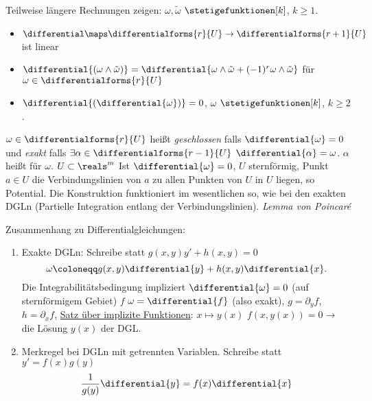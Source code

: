 \begin{blank}
  \begin{bemerkung*}
    Teilweise längere Rechnungen zeigen: \( \omega,\tilde{\omega}\) \( \stetigefunktionen[k]\), \( k\geq 1. \)

    \begin{itemize}
      \item \( \differential\maps \differentialforms{r}{U}\to\differentialforms{r+1}{U} \) ist linear 

      \item \( \differential{(\omega\wedge\tilde{\omega})}=\differential{\omega\wedge\tilde{\omega}+(-1)^r\omega\wedge\tilde{\omega}} \) für \( \omega\in\differentialforms{r}{U} \)
  
      \item \( \differential{(\differential{\omega})}=0 \), \( \omega\) \( \stetigefunktionen[k]\), \( k\geq 2 \).
    \end{itemize}
  \end{bemerkung*}
  \begin{definition*}
    \( \omega\in\differentialforms{r}{U} \) heißt \emph{geschlossen} falls \( \differential{\omega}=0 \) und \emph{exakt} falls \( \exists \alpha\in\differentialforms{r-1}{U} \) \sd \( \differential{\alpha}=\omega \).
    \( \alpha \) heißt  für \( \omega \). \( U\subset\reals^m \)
    Ist \( \differential{\omega}=0 \), \( U \) sternförmig, \dh \texists Punkt \( a\in U \) \sd die Verbindungslinien von \( a \) zu allen Punkten von \( U \) in \( U \) liegen, so \texists Potential.
    Die Konstruktion funktioniert im wesentlichen so, wie bei den exakten DGLn (Partielle Integration entlang der Verbindungslinien).
    \emph{Lemma von Poincaré}
  \end{definition*}
\end{blank}
\begin{bemerkung}
  Zusammenhang zu Differentialgleichungen: 
  \begin{enumerate}
      \item Exakte DGLn: Schreibe statt \( g(x,y)y'+h(x,y)=0 \)
      \begin{equation*}
          \omega\coloneqq g(x,y)\differential{y}+h(x,y)\differential{x}.
      \end{equation*}
      Die Integrabilitätsbedingung impliziert \( \differential{\omega}=0 \) \timplies (auf sternförmigem Gebiet) \texists  \(  f \) \sd \( \omega=\differential{f} \) (also exakt), \( g=\partial_y f\), \( h=\partial_x f \),
      \hyperref[satz_von_der_impliziten_funktion]{Satz über implizite Funktionen}: \texists  \(  x \mapsto y(x)\) \sd \( f(x,y(x))=0\to  \) die Lösung \( y(x) \) der DGL.\@
      \item Merkregel bei DGLn mit getrennten Variablen. Schreibe statt \( y'=f(x)g(y) \)
      \begin{equation*}
          \frac{1}{g(y)} \differential{y}=f(x)\differential{x}
      \end{equation*}
  \end{enumerate}
\end{bemerkung}

